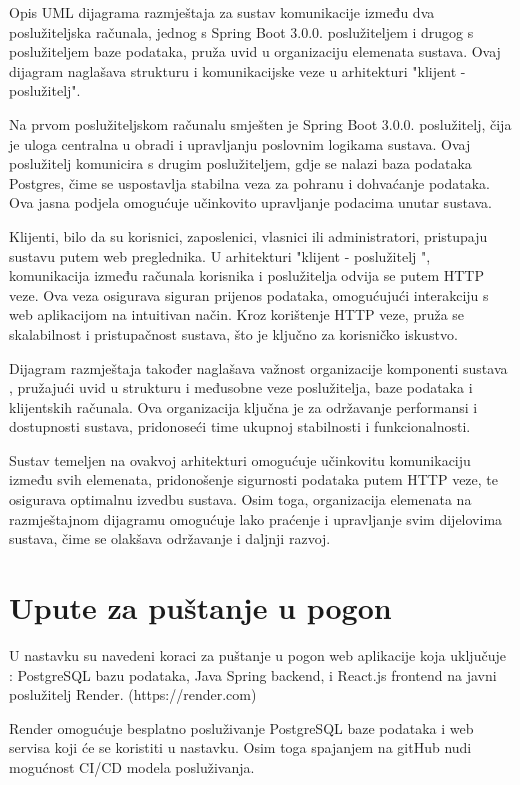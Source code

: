 Opis UML dijagrama razmještaja za sustav komunikacije između dva 
poslužiteljska računala, jednog s Spring Boot 3.0.0. poslužiteljem i drugog s 
poslužiteljem baze podataka, pruža uvid u organizaciju elemenata sustava. Ovaj 
dijagram naglašava strukturu i komunikacijske veze u arhitekturi "klijent - 
poslužitelj".

Na prvom poslužiteljskom računalu smješten je Spring Boot 3.0.0. poslužitelj, 
čija je uloga centralna u obradi i upravljanju poslovnim logikama sustava. 
Ovaj poslužitelj komunicira s drugim poslužiteljem, gdje se nalazi baza 
podataka Postgres, čime se uspostavlja stabilna veza za pohranu i dohvaćanje 
podataka. Ova jasna podjela omogućuje učinkovito upravljanje podacima unutar 
sustava.

Klijenti, bilo da su korisnici, zaposlenici, vlasnici ili administratori, 
pristupaju sustavu putem web preglednika. U arhitekturi "klijent - poslužitelj
", komunikacija između računala korisnika i poslužitelja odvija se putem HTTP 
veze. Ova veza osigurava siguran prijenos podataka, omogućujući interakciju s 
web aplikacijom na intuitivan način. Kroz korištenje HTTP veze, pruža se 
skalabilnost i pristupačnost sustava, što je ključno za korisničko 
iskustvo.

Dijagram razmještaja također naglašava važnost organizacije komponenti sustava
, pružajući uvid u strukturu i međusobne veze poslužitelja, baze podataka i 
klijentskih računala. Ova organizacija ključna je za održavanje performansi i 
dostupnosti sustava, pridonoseći time ukupnoj stabilnosti i 
funkcionalnosti.

Sustav temeljen na ovakvoj arhitekturi omogućuje učinkovitu komunikaciju 
između svih elemenata, pridonošenje sigurnosti podataka putem HTTP veze, te 
osigurava optimalnu izvedbu sustava. Osim toga, organizacija elemenata na 
razmještajnom dijagramu omogućuje lako praćenje i upravljanje svim dijelovima 
sustava, čime se olakšava održavanje i daljnji razvoj.
			
			\eject 
		
		\section{Upute za puštanje u pogon}
		
U nastavku su navedeni koraci za puštanje u pogon web aplikacije koja uključuje
: PostgreSQL bazu podataka, Java Spring backend, i React.js frontend na javni 
poslužitelj Render. (https://render.com)

Render omogućuje besplatno posluživanje PostgreSQL baze podataka i web servisa 
koji će se koristiti u nastavku. Osim toga spajanjem na gitHub nudi mogućnost 
CI/CD modela posluživanja.

